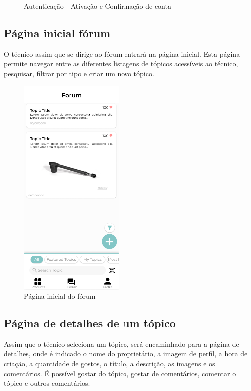 \begin{figure}[htb]
    \caption{Autenticação - Ativação e Confirmação de conta}%
    \label{fig:25}%
\end{figure}

\newpage

\subsection{Página inicial fórum}

O técnico assim que se dirige ao fórum entrará na página inicial. Esta página permite navegar entre as diferentes listagens de tópicos acessíveis ao técnico, pesquisar, filtrar por tipo e criar um novo tópico.

\begin{figure}[htb]
    \centering
    \includegraphics[width=0.45\textwidth]{images/mockups/forum_home.png}
    \caption{Página inicial do fórum}
    \label{fig:26}
\end{figure}

\newpage

\subsection{Página de detalhes de um tópico}

Assim que o técnico seleciona um tópico, será encaminhado para a página de detalhes, onde é indicado o nome do proprietário, a imagem de perfil, a hora de criação, a quantidade de gostos, o título, a descrição, as imagens e os comentários. É possível gostar do tópico, gostar de comentários, comentar o tópico e outros comentários.

